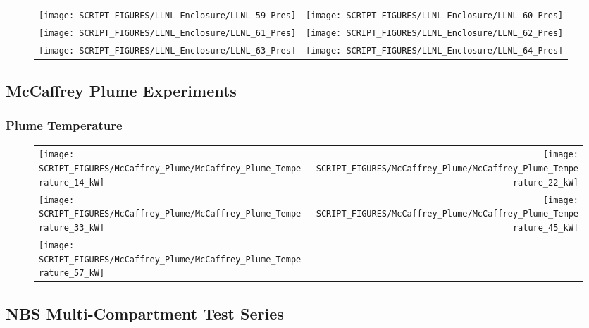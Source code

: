 \begin{figure}[!ht]
\begin{tabular*}{\textwidth}{l@{\extracolsep{\fill}}r}
\texttt{[image: SCRIPT\_FIGURES/LLNL\_Enclosure/LLNL\_59\_Pres]} &
\texttt{[image: SCRIPT\_FIGURES/LLNL\_Enclosure/LLNL\_60\_Pres]} \\
\texttt{[image: SCRIPT\_FIGURES/LLNL\_Enclosure/LLNL\_61\_Pres]} &
\texttt{[image: SCRIPT\_FIGURES/LLNL\_Enclosure/LLNL\_62\_Pres]} \\
\texttt{[image: SCRIPT\_FIGURES/LLNL\_Enclosure/LLNL\_63\_Pres]} &
\texttt{[image: SCRIPT\_FIGURES/LLNL\_Enclosure/LLNL\_64\_Pres]}
\end{tabular*}
\label{LLNL_Enclosure_Pres_6}
\end{figure}

\clearpage

\subsection{McCaffrey Plume Experiments}

\subsubsection{Plume Temperature}

\begin{figure}[!ht]
\begin{tabular*}{\textwidth}{l@{\extracolsep{\fill}}r}
\texttt{[image: SCRIPT\_FIGURES/McCaffrey\_Plume/McCaffrey\_Plume\_Temperature\_14\_kW]} &
\texttt{[image: SCRIPT\_FIGURES/McCaffrey\_Plume/McCaffrey\_Plume\_Temperature\_22\_kW]} \\
\texttt{[image: SCRIPT\_FIGURES/McCaffrey\_Plume/McCaffrey\_Plume\_Temperature\_33\_kW]} &
\texttt{[image: SCRIPT\_FIGURES/McCaffrey\_Plume/McCaffrey\_Plume\_Temperature\_45\_kW]} \\
\texttt{[image: SCRIPT\_FIGURES/McCaffrey\_Plume/McCaffrey\_Plume\_Temperature\_57\_kW]} &
\end{tabular*}
\label{McCaffrey_Plume_Temperature}
\end{figure}

\clearpage

\subsection{NBS Multi-Compartment Test Series}

